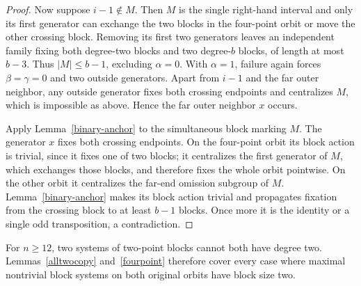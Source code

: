 \documentclass[11pt,a4paper]{article}
\begin{document}
\begin{proof}
Now suppose $i-1\notin M$. Then $M$ is the single right-hand
interval and only its first generator can exchange the two
blocks in the four-point orbit or move the other crossing block.
Removing its first two generators leaves an independent family
fixing both degree-two blocks and two degree-$b$ blocks, of
length at most $b-3$. Thus $|M|\leq b-1$, excluding
$\alpha=0$. With $\alpha=1$, failure again forces
$\beta=\gamma=0$ and two outside generators. Apart from
$i-1$ and the far outer neighbor, any outside generator fixes
both crossing endpoints and centralizes $M$, which is
impossible as above. Hence the far outer neighbor $x$ occurs.

Apply Lemma~\ref{binary-anchor} to the simultaneous block
marking $M$. The generator $x$ fixes both crossing endpoints.
On the four-point orbit its block action is trivial, since it
fixes one of two blocks; it centralizes the first generator
of $M$, which exchanges those blocks, and therefore fixes the
whole orbit pointwise. On the other orbit it centralizes the
far-end omission subgroup of $M$. Lemma~\ref{binary-anchor}
makes its block action trivial and propagates fixation from
the crossing block to at least $b-1$ blocks. Once more it is
the identity or a single odd transposition, a contradiction.
\end{proof}

For $n\geq12$, two systems of two-point blocks cannot both
have degree two. Lemmas~\ref{alltwocopy} and~\ref{fourpoint}
therefore cover every case where maximal nontrivial block
systems on both original orbits have block size two.
\end{document}
